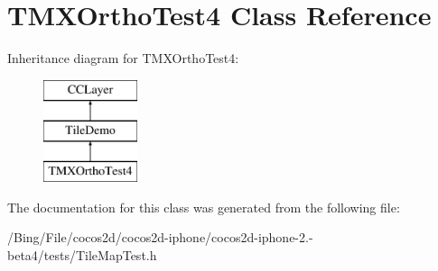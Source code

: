 \hypertarget{interface_t_m_x_ortho_test4}{\section{T\-M\-X\-Ortho\-Test4 Class Reference}
\label{interface_t_m_x_ortho_test4}
}
Inheritance diagram for T\-M\-X\-Ortho\-Test4\-:\begin{figure}[H]
\begin{center}
\leavevmode
\includegraphics[height=3.000000cm]{interface_t_m_x_ortho_test4}
\end{center}
\end{figure}


The documentation for this class was generated from the following file\-:\begin{DoxyCompactItemize}
\item 
/\-Bing/\-File/cocos2d/cocos2d-\/iphone/cocos2d-\/iphone-\/2.-\/beta4/tests/Tile\-Map\-Test.\-h\end{DoxyCompactItemize}
